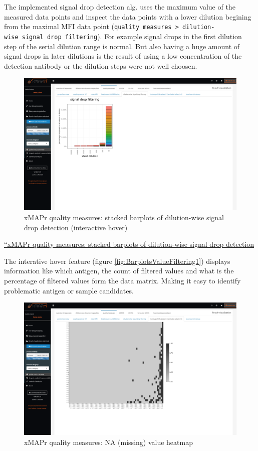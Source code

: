 \documentclass[
]{book}
\begin{document}
The implemented signal drop detection alg. uses the maximum value of the measured data points and inspect the data points with a lower dilution begining from the maximal MFI data point (\texttt{quality\ measures\ \textgreater{}\ dilution-wise\ signal\ drop\ filtering}). For example signal drops in the first dilution step of the serial dilution range is normal. But also having a huge amount of signal drops in later dilutions is the result of using a low concentration of the detection antibody or the dilution steps were not well choosen.

\begin{figure}
\includegraphics[width=50.5in]{figures/quality_measures__value_filtering_signal_drop} \caption{xMAPr quality measures: stacked barplots of dilution-wise signal drop detection (interactive hover)}\label{fig:BarplotsValueFiltering2}
\end{figure}

\href{figures/quality_measures__value_filtering_signal_drop.png}{``xMAPr quality measures: stacked barplots of dilution-wise signal drop detection}

The interative hover feature (figure \ref{fig:BarplotsValueFiltering1}) displays information like which antigen, the count of filtered values and what is the percentage of filtered values form the data matrix. Making it easy to identify problematic antigen or sample candidates.

\begin{figure}
\includegraphics[width=50.47in]{figures/quality_measures__NA_value_heatmap} \caption{xMAPr quality measures: NA (missing) value heatmap}\label{fig:heatmapNA}
\end{figure}
\end{document}

